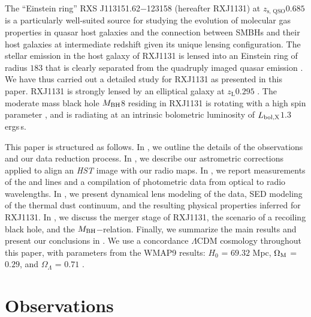 \documentclass[]{emulateapj}
\begin{document}
The ``Einstein ring'' RXS J113151.62$-$123158 (hereafter RXJ1131) 
at $z_\textrm{s, QSO}$\eq$0.685$ \citep[hereafter S03]{Sluse03a} is a particularly well-suited source for
studying the evolution of molecular gas properties in quasar host galaxies and the 
connection between SMBHs and their host galaxies at intermediate redshift
given its unique lensing configuration.
The stellar emission in the host galaxy of RXJ1131 is lensed into
an Einstein ring of radius $1$\farcs$83$
that is clearly separated from the quadruply imaged quasar emission \citep[hereafter C06]{Claeskens06a}.
We have thus carried out a detailed study for RXJ1131 as presented in this paper.
RXJ1131 is strongly lensed by an elliptical galaxy at $z_\textrm{L}$\eq$0.295$ .
The moderate mass black hole $M_{\rm BH}$\eq$8$\Msun \citep{Sluse12a} %
residing in RXJ1131 is rotating with a high spin parameter \citep[$a$\,$\sim$\,$0.9$;][]{Reis14a}, and
is radiating at an intrinsic bolometric luminosity of $L_{\rm bol, X}$\eq$1.3$\, ergs\,s\pmOne \citep{Pooley07a}.

This paper is structured as follows.
In , we outline the details of the observations and our data reduction process.
In , we describe our astrometric corrections applied to align an {\it HST} image with our radio maps.
In , we report measurements of the \bco and \cco lines and a compilation of photometric data from optical to radio wavelengths.
In , we present dynamical lens modeling of the \bco data, SED modeling of the thermal dust continuum, 
and the resulting physical properties inferred for RXJ1131.
In , we discuss the merger stage of RXJ1131, 
the scenario of a recoiling black hole, and the $M_{\rm BH}$$-$\mdyn relation.
Finally, we summarize the main results and present our conclusions in .
We use a concordance $\Lambda$CDM cosmology throughout this paper, with
parameters from the WMAP9 results:
$H_0$ = $69.32$ \kms Mpc\pmOne, $\Omega_{\rm M}$ = $0.29$, and
$\Omega_{\Lambda}$ = $0.71$ \citep{Hinshaw13a}.

\section{Observations} \label{sec:obs}
\end{document}

